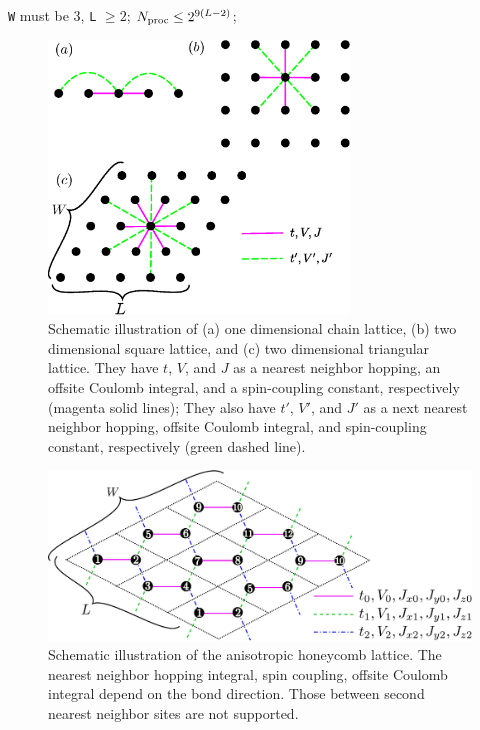 \begin{itemize}
\begin{itemize}
    \verb|W| must be 3, \verb|L| $\geq 2$; $N_{\rm proc} \leq 2^{9(L-2)}$;

\end{itemize}

\begin{figure}[!htbp]
  \begin{center}
    \includegraphics[width=8cm]{../figs/chap04_1_lattice.eps}
    \caption{Schematic illustration of
      (a) one dimensional chain lattice, 
      (b) two dimensional square lattice, and 
      (c) two dimensional triangular lattice.
      They have $t$, $V$, and $J$ as a nearest neighbor hopping, an offsite Coulomb integral, 
      and a spin-coupling constant, respectively (magenta solid lines);
      They also have $t'$, $V'$, and $J'$ as a next nearest neighbor hopping, offsite Coulomb integral, 
      and spin-coupling constant, respectively (green dashed line).
    }
    \label{fig_chap04_1_lattice}
  \end{center}
\end{figure}

\begin{figure}[!htbp]
  \begin{center}
    \includegraphics[width=15cm]{../figs/chap04_1_honeycomb.eps}
    \caption{Schematic illustration of the anisotropic honeycomb lattice.
      The nearest neighbor 
      hopping integral, spin coupling, offsite Coulomb integral
      depend on the bond direction.
      Those between second nearest neighbor sites are not supported.
    }
    \label{fig_chap04_1_honeycomb}
  \end{center}
\end{figure}


\end{itemize}
